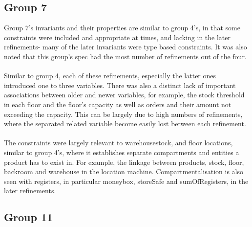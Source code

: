 \subsection{Group 7}
\label{group7}

Group 7’s invariants and their properties are similar to group 4’s, in that some constraints were included and appropriate at times, and lacking in the later refinements- many of the later invariants were type based constraints. It was also noted that this group’s spec had the most number of refinements out of the four.
 \\ \\ Similar to group 4, each of these refinements, especially the latter ones introduced one to three variables. There was also a distinct lack of important associations between older and newer variables, for example, the stock threshold in each floor and the floor’s capacity as well as orders and their amount not exceeding the capacity. This can be largely due to high numbers of refinements, where the separated related variable become easily lost between each refinement.
 \\ \\ The constraints were largely relevant to warehousestock, and floor locations, similar to group 4’s, where it establishes separate compartments and entities a product has to exist in. For example, the linkage between products, stock, floor, backroom and warehouse in the location machine. Compartmentalisation is also seen with registers, in particular moneybox, storeSafe and sumOfRegisters, in the later refinements. 

\subsection{Group 11}
\label{group11}

